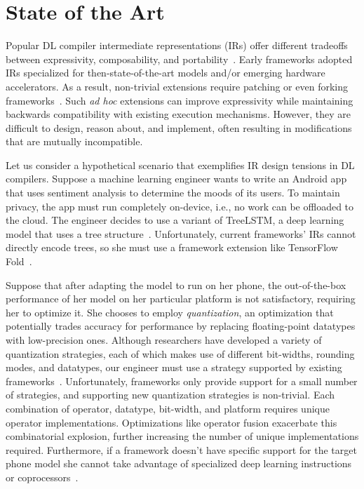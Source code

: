 \section{State of the Art}

Popular DL compiler intermediate representations (IRs) offer different tradeoffs
  between expressivity, composability, and portability~\citep{
    tensorflow, pytorch_ad, chainer_learningsys2015, tangent, theano, glow}.
Early frameworks adopted IRs
  specialized for then-state-of-the-art models and/or
  emerging hardware accelerators.
As a result, non-trivial extensions require
  patching or even forking frameworks~\citep{
    tf_fold, tf_lite, tangent, tf_eager, xla, glow, torchscript}.
Such \textit{ad hoc} extensions can improve expressivity
  while maintaining backwards compatibility with existing execution mechanisms.
However, they are difficult to design, reason about, and implement,
  often resulting in modifications that are mutually incompatible.

Let us consider a hypothetical scenario that exemplifies
  IR design tensions in DL compilers.
Suppose a machine learning engineer wants to write
  an Android app that uses sentiment analysis to
  determine the moods of its users.
To maintain privacy, the app must run completely on-device,
  i.e., no work can be offloaded to the cloud.
The engineer decides to use a variant of TreeLSTM,
  a deep learning model that uses a tree structure~\citep{tree_lstm}.
Unfortunately, current frameworks' IRs cannot directly encode trees,
  so she must use a framework extension
  like TensorFlow Fold~\citep{tensorflowfold}.

Suppose that after adapting the model to run on her phone,
  the out-of-the-box performance of her
  model on her particular platform is not satisfactory, requiring her to optimize it.
She chooses to employ \textit{quantization}, an optimization that
  potentially trades accuracy for performance by replacing
  floating-point datatypes with low-precision ones.
Although researchers have developed a variety of quantization
  strategies, each of which makes use of different bit-widths, rounding
  modes, and datatypes, our engineer must use a strategy supported
  by existing frameworks~\citep{gustafson2015end, tf_lite_ops_compat, glow_quant}.
Unfortunately, frameworks only provide support for a small number
  of strategies, and supporting new quantization strategies is non-trivial.
Each combination of operator, datatype, bit-width, and
  platform requires unique operator implementations.
Optimizations like operator fusion exacerbate this combinatorial explosion,
  further increasing the number of unique implementations required.
Furthermore, if a framework doesn't have specific support for
  the target phone model she cannot take advantage of specialized deep learning
  instructions or coprocessors~\citep{apple_neural_engine}.


